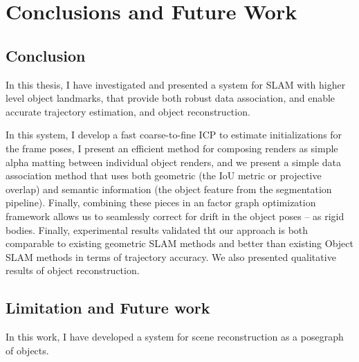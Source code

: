 
\chapter{Conclusions and Future Work} \label{chapConclusions}

\section{Conclusion}
In this thesis, I have investigated and presented a system for SLAM with higher level object landmarks, that provide both robust data association, and enable accurate trajectory estimation, and object reconstruction.

In this system, I develop a fast coarse-to-fine ICP to estimate initializations for the frame poses, I present an efficient method for composing renders as simple alpha matting between individual object renders, and we present a simple data association method that uses both geometric (the IoU metric or projective overlap) and semantic information (the object feature from the segmentation pipeline). Finally, combining these pieces in an factor graph optimization framework allows us to seamlessly correct for drift in the object poses -- as rigid bodies. Finally, experimental results validated tht our approach is both comparable to existing geometric SLAM methods and better than existing Object SLAM methods in terms of trajectory accuracy. We also presented qualitative results of object reconstruction.

\section{Limitation and Future work}

In this work, I have developed a system for scene reconstruction as a posegraph of objects.

